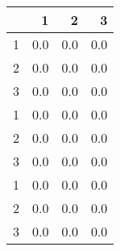 \begin{tabular}{lrrr}
\toprule
{} &    1 &    2 &    3 \\
\midrule
1 &  0.0 &  0.0 &  0.0 \\
2 &  0.0 &  0.0 &  0.0 \\
3 &  0.0 &  0.0 &  0.0 \\
1 &  0.0 &  0.0 &  0.0 \\
2 &  0.0 &  0.0 &  0.0 \\
3 &  0.0 &  0.0 &  0.0 \\
1 &  0.0 &  0.0 &  0.0 \\
2 &  0.0 &  0.0 &  0.0 \\
3 &  0.0 &  0.0 &  0.0 \\
\bottomrule
\end{tabular}
